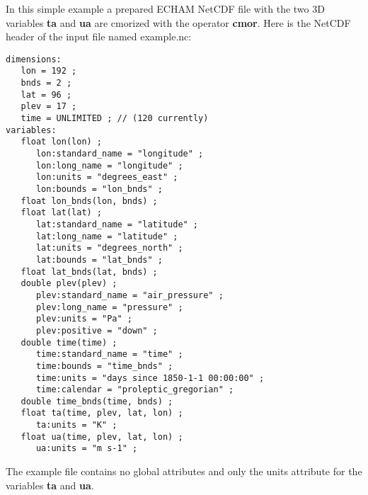 In this simple example a prepared ECHAM NetCDF file with the two 3D
variables \textbf{ta} and \textbf{ua} are cmorized with the {\CDO} operator \textbf{cmor}. 
Here is the NetCDF header of the input file named example.nc:
\begin{lstlisting}[frame=single, backgroundcolor=\color{pcolor1}, basicstyle=\footnotesize]
dimensions:
   lon = 192 ;
   bnds = 2 ;
   lat = 96 ;
   plev = 17 ;
   time = UNLIMITED ; // (120 currently)
variables:
   float lon(lon) ;
      lon:standard_name = "longitude" ;
      lon:long_name = "longitude" ;
      lon:units = "degrees_east" ;
      lon:bounds = "lon_bnds" ;
   float lon_bnds(lon, bnds) ;
   float lat(lat) ;
      lat:standard_name = "latitude" ;
      lat:long_name = "latitude" ;
      lat:units = "degrees_north" ;
      lat:bounds = "lat_bnds" ;
   float lat_bnds(lat, bnds) ;
   double plev(plev) ;
      plev:standard_name = "air_pressure" ;
      plev:long_name = "pressure" ;
      plev:units = "Pa" ;
      plev:positive = "down" ;
   double time(time) ;
      time:standard_name = "time" ;
      time:bounds = "time_bnds" ;
      time:units = "days since 1850-1-1 00:00:00" ;
      time:calendar = "proleptic_gregorian" ;
   double time_bnds(time, bnds) ;
   float ta(time, plev, lat, lon) ;
      ta:units = "K" ;
   float ua(time, plev, lat, lon) ;
      ua:units = "m s-1" ;
\end{lstlisting}
The example file contains no global attributes and only the units
attribute for the variables \textbf{ta} and \textbf{ua}.

